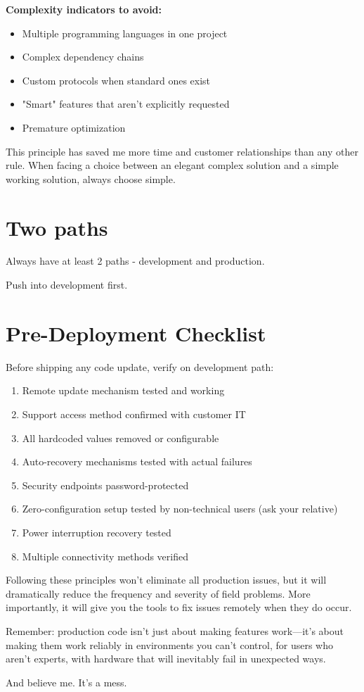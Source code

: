 \textbf{Complexity indicators to avoid:}
\begin{itemize}
\item Multiple programming languages in one project
\item Complex dependency chains
\item Custom protocols when standard ones exist
\item "Smart" features that aren't explicitly requested
\item Premature optimization
\end{itemize}

This principle has saved me more time and customer relationships than any other rule. When facing a choice between an elegant complex solution and a simple working solution, always choose simple.

\section{Two paths}
Always have at least 2 paths - development and production.

Push into development first.

\section{Pre-Deployment Checklist}

Before shipping any code update, verify on development path:

\begin{enumerate}
\item Remote update mechanism tested and working
\item Support access method confirmed with customer IT
\item All hardcoded values removed or configurable
\item Auto-recovery mechanisms tested with actual failures
\item Security endpoints password-protected
\item Zero-configuration setup tested by non-technical users (ask your relative)
\item Power interruption recovery tested
\item Multiple connectivity methods verified
\end{enumerate}

Following these principles won't eliminate all production issues, but it will dramatically reduce the frequency and severity of field problems. More importantly, it will give you the tools to fix issues remotely when they do occur.

Remember: production code isn't just about making features work—it's about making them work reliably in environments you can't control, for users who aren't experts, with hardware that will inevitably fail in unexpected ways.

And believe me. It's a mess.